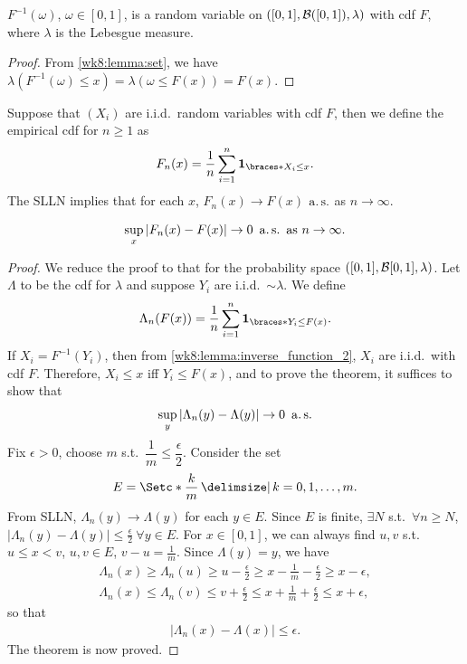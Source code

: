 \documentclass[12pt]{article}
\begin{document}
\begin{Lemma} \label{wk8:lemma:inverse_function_2}
$F^{-1}(\omega)$, $\omega\in[0,1]$, is a random variable on $([0,1],\mathcal{B}([0,1]),\lambda)$ with cdf $F$, where $\lambda$ is the Lebesgue measure.
\end{Lemma}
\begin{proof}
From \cref{wk8:lemma:set}, we have $\lambda (F^{-1}(\omega)\leq x)= \lambda (\omega \leq F(x))=F(x)$.
\end{proof}

Suppose that $(X_i)$ are i.i.d.\ random variables with cdf $F$, then we define the empirical cdf for $n\geq1$ as
\begin{align*}
F_n(x)=\frac{1}{n}\sum_{i=1}^n \indicator{X_i\leq x}.
\end{align*}
The SLLN implies that for each $x$, $F_n(x)\to F(x)$ $\operatorname{a.s.}$ as $n\to \infty$. 

\begin{Theorem}
\begin{align*}
\sup_{x}|F_n(x)-F(x)| \to 0\ \operatorname{a.s.}\ \text{as}\ n \to \infty.
\end{align*}
\end{Theorem}
\begin{proof}
We reduce the proof to that for the probability space $([0,1],\mathcal{B}[0,1],\lambda)$. Let $\Lambda$ to be the cdf for $\lambda$ and suppose $Y_i$ are i.i.d.\ $\sim \lambda$. We define 
\begin{align*}
\Lambda_n(F(x))=\frac{1}{n}\sum_{i=1}^n \indicator{Y_i\leq F(x)}.
\end{align*}
If $X_i= F^{-1}(Y_i)$, then from \cref{wk8:lemma:inverse_function_2}, $X_i$ are i.i.d.\ with cdf $F$. Therefore, $X_i \leq x$ iff $Y_i \leq F(x)$, and to prove the theorem, it suffices to show that 
\begin{align*}
\sup_{y} |\Lambda_n(y)-\Lambda(y)|\to 0\ \operatorname{a.s.}
\end{align*}
Fix $\epsilon >0$, choose $m$ s.t.\ $\dfrac{1}{m} \leq \dfrac{\epsilon}{2}$. Consider the set 
\begin{align*}
E=\set*{\frac{k}{m}\given k=0,1,\ldots,m}.
\end{align*}
From SLLN, $\Lambda _n (y) \to \Lambda(y)$ for each $y\in E$. Since $E$ is finite, $\exists N$ s.t.\ $\forall n \geq N$, $|\Lambda_n (y)-\Lambda (y)| \leq \frac{\epsilon}{2} \ \forall y \in E$. For $x \in [0,1]$, we can always find $u,v$ s.t.\ $u\leq x <v$, $u,v \in E$, $v-u=\frac{1}{m}$.
Since $\Lambda (y)=y$, we have
\begin{align*}
\Lambda_n (x)\geq \Lambda_n (u) \geq u-\frac{\epsilon}{2} \geq x-\frac{1}{m} -\frac{\epsilon}{2} \geq x-\epsilon,\\
\Lambda_n (x)\leq \Lambda_n (v) \leq v+\frac{\epsilon}{2} \leq x+\frac{1}{m} +\frac{\epsilon}{2} \leq x+\epsilon,
\end{align*}
so that
\begin{align*}
|\Lambda_n(x)-\Lambda(x)|\leq \epsilon.
\end{align*}
The theorem is now proved.
\end{proof}
\end{document}
